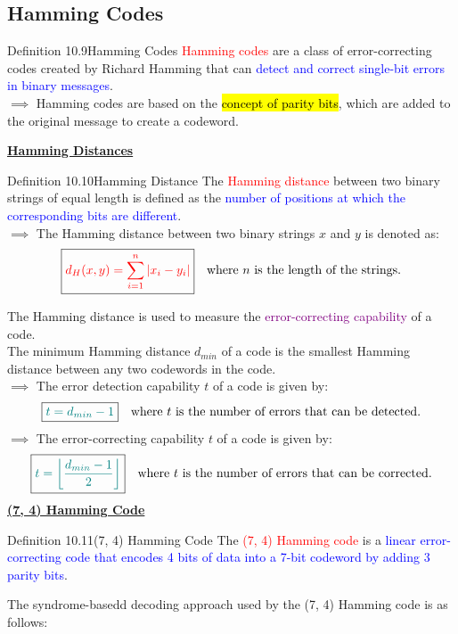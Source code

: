 \documentclass{book}
\begin{document}
\subsection{Hamming Codes}
\begin{defBox}{Definition 10.9}{Hamming Codes}
    \textcolor{red}{Hamming codes} are a class of error-correcting codes created by Richard Hamming that can \textcolor{blue}{detect and correct single-bit errors in binary messages}.\\
    $\implies$ Hamming codes are based on the \hl{concept of parity bits}, which are added to the original message to create a codeword.
\end{defBox}
\uline{\textbf{Hamming Distances}}\\
\begin{defBox}{Definition 10.10}{Hamming Distance}
    The \textcolor{red}{Hamming distance} between two binary strings of equal length is defined as the \textcolor{blue}{number of positions at which the corresponding bits are different}.\\
    $\implies$ The Hamming distance between two binary strings $x$ and $y$ is denoted as:
    \[
        \boxed{\textcolor{red}{d_H(x, y) = \sum_{i=1}^{n} |x_i - y_i|}} \quad \text{where } n \text{ is the length of the strings.}
    \]
\end{defBox}
The Hamming distance is used to measure the \textcolor{purple}{error-correcting capability} of a code.\\
\vspace{2mm}
The minimum Hamming distance $d_{min}$ of a code is the smallest Hamming distance between any two codewords in the code.\\
$\implies$ The error detection capability $t$ of a code is given by:
\[
    \boxed{\textcolor{teal}{t = d_{min} - 1}} \quad \text{where } t \text{ is the number of errors that can be detected.}
\]
$\implies$ The error-correcting capability $t$ of a code is given by:
\[
    \boxed{\textcolor{teal}{t = \left\lfloor \frac{d_{min} - 1}{2} \right\rfloor}} \quad \text{where } t \text{ is the number of errors that can be corrected.}
\]
\uline{\textbf{(7, 4) Hamming Code}}\\
\begin{defBox}{Definition 10.11}{(7, 4) Hamming Code}
    The \textcolor{red}{(7, 4) Hamming code} is a \textcolor{blue}{linear error-correcting code that encodes 4 bits of data into a 7-bit codeword by adding 3 parity bits}.
\end{defBox}
The syndrome-basedd decoding approach used by the (7, 4) Hamming code is as follows:
\end{document}

